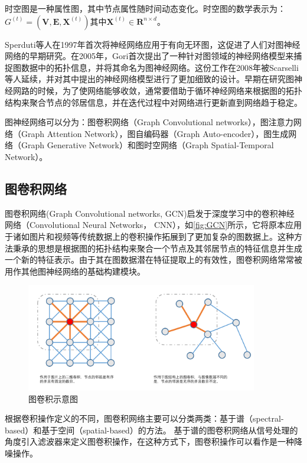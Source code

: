 \begin{definition}[时空图]
\label{def:spatial-temporal-graph}
时空图是一种属性图，其中节点属性随时间动态变化。时空图的数学表示为：$G^{(t)}=\left(\mathbf{V}, \mathbf{E}, \mathbf{X}^{(t)}\right) \text{其中} \mathbf{X}^{(t)} \in \mathbf{R}^{n \times d}$。
\end{definition}

Sperduti\cite{sperduti1997supervised}等人在1997年首次将神经网络应用于有向无环图，这促进了人们对图神经网络的早期研究。在2005年，Gori\cite{gori2005new}首次提出了一种针对图领域的神经网络模型来捕捉图数据中的拓扑信息，并将其命名为图神经网络。这份工作在2008年被Scarselli\cite{scarselli2008graph}等人延续，并对其中提出的神经网络模型进行了更加细致的设计。早期在研究图神经网路的时候，为了使网络能够收敛，通常要借助于循环神经网络来根据图的拓扑结构来聚合节点的邻居信息，并在迭代过程中对网络进行更新直到网络趋于稳定。

图神经网络可以分为：图卷积网络（Graph Convolutional networks），图注意力网络（Graph Attention Network），图自编码器（Graph Auto-encoder），图生成网络（Graph Generative Network）和图时空网络（Graph Spatial-Temporal Network）。

\subsection{图卷积网络}
图卷积网络(Graph Convolutional networks, GCN)启发于深度学习中的卷积神经网络（Convolutional Neural Networks， CNN），如\autoref{fig:GCN}所示，它将原本应用于诸如图片和视频等传统数据上的卷积操作拓展到了更加复杂的图数据上。这种方法秉承的思想是根据图的拓扑结构来聚合一个节点及其邻居节点的特征信息并生成一个新的特征表示。由于其在图数据潜在特征提取上的有效性，图卷积网络常常被用作其他图神经网络的基础构建模块。
\begin{figure}[htb]
    \includegraphics[width=0.9\textwidth]{fig/GCN.pdf}
    \caption{图卷积示意图}
    \label{fig:GCN}
  \end{figure}
根据卷积操作定义的不同，图卷积网络主要可以分类两类：基于谱（spectral-based）和基于空间（spatial-based）的方法。
基于谱的图卷积网络从信号处理的角度引入滤波器来定义图卷积操作，在这种方式下，图卷积操作可以看作是一种降噪操作。

